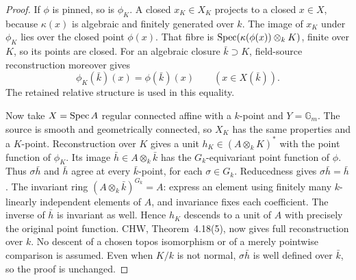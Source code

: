 \begin{proof}
If $\phi$ is pinned, so is $\phi_K$. A closed $x_K\in X_K$
projects to a closed $x\in X$, because $\kappa(x)$ is algebraic
and finitely generated over $k$. The image of $x_K$ under
$\phi_K$ lies over the closed point $\phi(x)$.
That fibre is $\operatorname{Spec}(\kappa(\phi(x))\otimes_kK)$, finite over
$K$, so its points are closed. For an algebraic closure
$\bar k\supset K$, field-source reconstruction
\citep[Proposition~3.6]{F_CHW2024} moreover gives
\[
 \phi_K(\bar k)(x)=\phi(\bar k)(x)
 \qquad(x\in X(\bar k)).
\]
The retained relative structure is used in this equality.

Now take $X=\operatorname{Spec} A$ regular connected affine with a $k$-point
and $Y=\mathbb G_m$. The source is smooth and geometrically
connected, so $X_K$ has the same properties and a $K$-point.
Reconstruction over $K$ gives a unit
$h_K\in(A\otimes_kK)^*$ with the point function of $\phi_K$.
Its image $\bar h\in A\otimes_k\bar k$ has the
$G_k$-equivariant point function of $\phi$. Thus
$\sigma\bar h$ and $\bar h$ agree at every $\bar k$-point,
for each $\sigma\in G_k$. Reducedness gives
$\sigma\bar h=\bar h$. The invariant ring
$(A\otimes_k\bar k)^{G_k}=A$: express an element using finitely
many $k$-linearly independent elements of $A$, and invariance
fixes each coefficient. The inverse of $\bar h$ is invariant
as well. Hence $h_K$ descends to a unit of $A$ with precisely
the original point function. CHW, Theorem~4.18(5), now gives
full reconstruction over $k$. No descent of a chosen topos
isomorphism or of a merely pointwise comparison is assumed.
Even when $K/k$ is not normal, $\sigma\bar h$ is well defined
over $\bar k$, so the proof is unchanged.
\end{proof}

